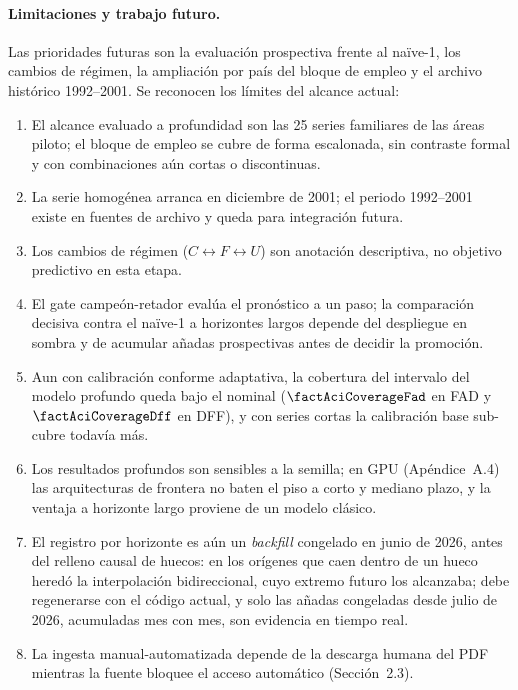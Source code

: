 \documentclass[12pt,letterpaper]{report}
\begin{document}
\paragraph{Limitaciones y trabajo futuro.} Las prioridades futuras son la evaluación
prospectiva frente al naïve-1, los cambios de régimen, la ampliación por país del bloque de
empleo y el archivo histórico 1992--2001. Se reconocen los límites del alcance actual:
\begin{enumerate}[label=(\roman*), leftmargin=*, itemsep=1pt]
\item El alcance evaluado a profundidad son las 25 series familiares de las áreas piloto; el
bloque de empleo se cubre de forma escalonada, sin contraste formal y con combinaciones aún
cortas o discontinuas.
\item La serie homogénea arranca en diciembre de 2001; el periodo 1992--2001 existe en
fuentes de archivo y queda para integración futura.
\item Los cambios de régimen ($C \leftrightarrow F \leftrightarrow U$) son anotación
descriptiva, no objetivo predictivo en esta etapa.
\item El gate campeón-retador evalúa el pronóstico a un paso; la comparación decisiva contra
el naïve-1 a horizontes largos depende del despliegue en sombra y de acumular añadas
prospectivas antes de decidir la promoción.
\item Aun con calibración conforme adaptativa, la cobertura del intervalo del modelo profundo
queda bajo el nominal ($\factAciCoverageFad$ en FAD y $\factAciCoverageDff$ en DFF), y con series
cortas la calibración base sub-cubre todavía más.
\item Los resultados profundos son sensibles a la semilla; en GPU (Apéndice~A.4) las
arquitecturas de frontera no baten el piso a corto y mediano plazo, y la ventaja a horizonte
largo proviene de un modelo clásico.
\item El registro por horizonte es aún un \textit{backfill} congelado en junio de 2026, antes del relleno causal de huecos: en los orígenes que caen dentro de un hueco heredó la interpolación bidireccional, cuyo extremo futuro los alcanzaba;
debe regenerarse con el código actual, y solo las añadas congeladas desde julio de 2026,
acumuladas mes con mes, son evidencia en tiempo real.
\item La ingesta manual-automatizada depende de la descarga humana del PDF mientras la fuente
bloquee el acceso automático (Sección~2.3).
\end{enumerate}
\end{document}
